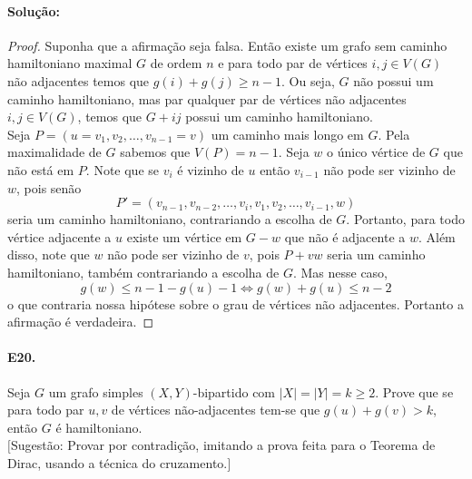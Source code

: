 \documentclass[11pt,a4paper,notitlepage]{exam}
\begin{document}
\paragraph{Solução: }
\begin{proof}
  Suponha que a afirmação seja falsa. Então existe um grafo sem caminho hamiltoniano maximal $G$  de ordem $n$ e para todo par de vértices $i,j \in V(G)$ não adjacentes temos que $g(i) + g(j) \geq n-1$. Ou seja, $G$ não possui um caminho hamiltoniano, mas par qualquer par de vértices não adjacentes $i,j \in V(G)$, temos que $G + ij$ possui um caminho hamiltoniano.\\
  Seja $P = (u=v_1, v_2, \dots , v_{n-1} = v)$ um caminho mais longo em $G$. Pela maximalidade de $G$ sabemos que $V(P) = n-1$. Seja $w$ o único vértice de $G$ que não está em $P$. Note que se $v_i$ é vizinho de $u$ então $v_{i-1}$ não pode ser vizinho de $w$, pois senão
  $$
    P' = (v_{n-1}, v_{n-2}, \dots, v_i,  v_1, v_2, \dots, v_{i-1}, w)
  $$
  seria um caminho hamiltoniano, contrariando a escolha de $G$. Portanto, para todo vértice adjacente a $u$ existe um vértice em $G - w$ que não é adjacente a $w$. Além disso, note que $w$ não pode ser vizinho de $v$, pois $P+vw$ seria um caminho hamiltoniano, também contrariando a escolha de $G$. Mas nesse caso,
  $$
    g(w) \leq n - 1 - g(u) - 1 \iff g(w) + g(u) \leq n - 2
  $$
  o que contraria nossa hipótese sobre o grau de vértices não adjacentes. Portanto a afirmação é verdadeira.
\end{proof}

\paragraph{E20. }Seja $G$ um grafo simples $(X, Y )$-bipartido com $|X| = |Y | = k \geq 2$. Prove que se para todo
par $u, v$ de vértices não-adjacentes tem-se que $g(u) + g(v) > k$, então $G$ é hamiltoniano.\medskip\\
$[$Sugestão: Provar por contradição, imitando a prova feita para o Teorema de Dirac, usando a técnica do cruzamento.$]$
\end{document}
